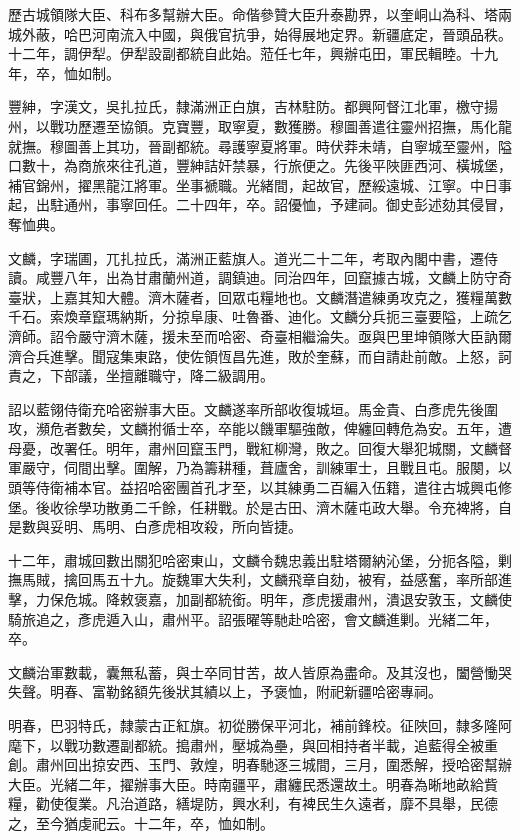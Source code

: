 \begin{pinyinscope}
歷古城領隊大臣、科布多幫辦大臣。命偕參贊大臣升泰勘界，以奎峒山為科、塔兩城外蔽，哈巴河南流入中國，與俄官抗爭，始得展地定界。新疆底定，晉頭品秩。十二年，調伊犁。伊犁設副都統自此始。蒞任七年，興辦屯田，軍民輯睦。十九年，卒，恤如制。

豐紳，字漢文，吳扎拉氏，隸滿洲正白旗，吉林駐防。都興阿督江北軍，檄守揚州，以戰功歷遷至協領。克寶豐，取寧夏，數獲勝。穆圖善遣往靈州招撫，馬化龍就撫。穆圖善上其功，晉副都統。尋護寧夏將軍。時伏莽未靖，自寧城至靈州，隘口數十，為商旅來往孔道，豐紳詰奸禁暴，行旅便之。先後平陜匪西河、橫城堡，補官錦州，擢黑龍江將軍。坐事褫職。光緒間，起故官，歷綏遠城、江寧。中日事起，出駐通州，事寧回任。二十四年，卒。詔優恤，予建祠。御史彭述劾其侵冒，奪恤典。

文麟，字瑞圃，兀扎拉氏，滿洲正藍旗人。道光二十二年，考取內閣中書，遷侍讀。咸豐八年，出為甘肅蘭州道，調鎮迪。同治四年，回竄據古城，文麟上防守奇臺狀，上嘉其知大體。濟木薩者，回眾屯糧地也。文麟潛遣練勇攻克之，獲糧萬數千石。索煥章竄瑪納斯，分掠阜康、吐魯番、迪化。文麟分兵扼三臺要隘，上疏乞濟師。詔令嚴守濟木薩，援未至而哈密、奇臺相繼淪失。亟與巴里坤領隊大臣訥爾濟合兵進擊。聞寇集東路，使佐領恆昌先進，敗於奎蘇，而自請赴前敵。上怒，訶責之，下部議，坐擅離職守，降二級調用。

詔以藍翎侍衛充哈密辦事大臣。文麟遂率所部收復城垣。馬金貴、白彥虎先後圍攻，瀕危者數矣，文麟拊循士卒，卒能以饑軍驅強敵，俾纏回轉危為安。五年，遭母憂，改署任。明年，肅州回竄玉門，戰紅柳灣，敗之。回復大舉犯城關，文麟督軍嚴守，伺間出擊。圍解，乃為籌耕種，葺廬舍，訓練軍士，且戰且屯。服闋，以頭等侍衛補本官。益招哈密團首孔才至，以其練勇二百編入伍籍，遣往古城興屯修堡。後收徐學功散勇二千餘，任耕戰。於是古田、濟木薩屯政大舉。令充裨將，自是數與妥明、馬明、白彥虎相攻殺，所向皆捷。

十二年，肅城回數出關犯哈密東山，文麟令魏忠義出駐塔爾納沁堡，分扼各隘，剿撫馬賊，擒回馬五十九。旋魏軍大失利，文麟飛章自劾，被宥，益感奮，率所部進擊，力保危城。降敕褒嘉，加副都統銜。明年，彥虎援肅州，潰退安敦玉，文麟使騎旅追之，彥虎遁入山，肅州平。詔張曜等馳赴哈密，會文麟進剿。光緒二年，卒。

文麟治軍數載，囊無私蓄，與士卒同甘苦，故人皆原為盡命。及其沒也，闔營慟哭失聲。明春、富勒銘額先後狀其績以上，予褒恤，附祀新疆哈密專祠。

明春，巴羽特氏，隸蒙古正紅旗。初從勝保平河北，補前鋒校。征陜回，隸多隆阿麾下，以戰功數遷副都統。搗肅州，壓城為壘，與回相持者半載，追藍得全被重創。肅州回出掠安西、玉門、敦煌，明春馳逐三城間，三月，圍悉解，授哈密幫辦大臣。光緒二年，擢辦事大臣。時南疆平，肅纏民悉還故土。明春為晰地畝給貲糧，勸使復業。凡治道路，繕堤防，興水利，有裨民生久遠者，靡不具舉，民德之，至今猶虔祀云。十二年，卒，恤如制。


\end{pinyinscope}
